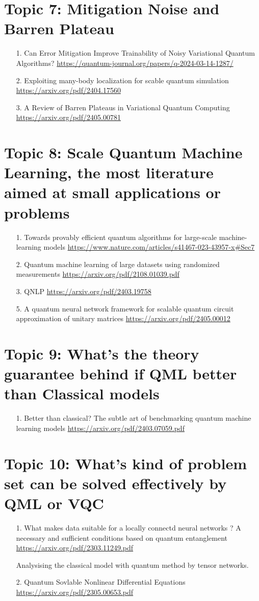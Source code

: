 \documentclass[12pt, oneside]{article}   	%
\begin{document}
\section{Topic 7: Mitigation Noise and Barren Plateau}
\begin{itemize}
\item[1. ] Can Error Mitigation Improve Trainability of Noisy Variational Quantum Algorithms? \url{https://quantum-journal.org/papers/q-2024-03-14-1287/}
\item [2. ] Exploiting many-body localization for scable quantum simulation \url{https://arxiv.org/pdf/2404.17560}
\item[3. ] A Review of Barren Plateaus in Variational Quantum Computing \url{https://arxiv.org/pdf/2405.00781}
\end{itemize}
\section{Topic 8: Scale Quantum Machine Learning, the most literature aimed at small applications or problems}
\begin{itemize}
\item[1. ] Towards provably efficient quantum algorithms for large-scale machine-learning models \url{https://www.nature.com/articles/s41467-023-43957-x#Sec7}
\item[2. ] Quantum machine learning of large datasets using randomized measurements \url{https://arxiv.org/pdf/2108.01039.pdf}
\item[3. ] QNLP \url{https://arxiv.org/pdf/2403.19758}
\item[5. ] A quantum neural network framework for scalable quantum circuit approximation of unitary matrices \url{https://arxiv.org/pdf/2405.00012}
\end{itemize}
\section{Topic 9: What's the theory guarantee behind if QML better than Classical models}
\begin{itemize}
\item[1. ]Better than classical? The subtle art of benchmarking	quantum machine learning models \url{https://arxiv.org/pdf/2403.07059.pdf}
\end{itemize}
\section{Topic 10: What's kind of problem set can be solved effectively  by QML or VQC}
\begin{itemize}
	\item [1.] What makes data suitable for a locally connectd neural networks ? A necessary and sufficient conditions based on quantum entanglement \url{https://arxiv.org/pdf/2303.11249.pdf}
	\par Analysising the classical model with quantum method by tensor networks.
	\item[2. ] Quantum Sovlable Nonlinear Differential Equations \url{https://arxiv.org/pdf/2305.00653.pdf}
\end{itemize}
\end{document}

